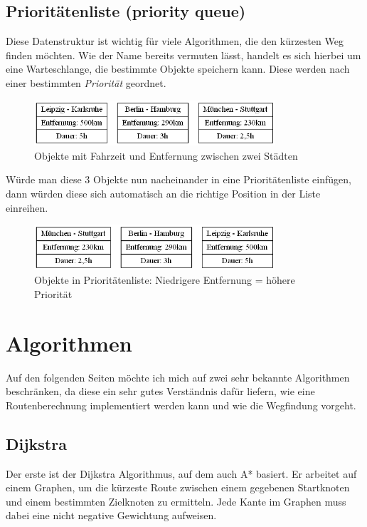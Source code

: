 \documentclass[11pt]{scrreprt}
\begin{document}
	\section{Prioritätenliste (priority queue)}
	Diese Datenstruktur ist wichtig für viele Algorithmen, die den kürzesten Weg finden möchten.
	Wie der Name bereits vermuten lässt, handelt es sich hierbei um eine Warteschlange, die bestimmte Objekte speichern kann.
	Diese werden nach einer bestimmten \textit{Priorität} geordnet.

	\begin{figure}[ht]
		\centering
		\includegraphics[width=0.8\textwidth]{Graphs/pq_objects}
		\caption{Objekte mit Fahrzeit und Entfernung zwischen zwei Städten}
	\end{figure}
	
	Würde man diese 3 Objekte nun nacheinander in eine Prioritätenliste einfügen, dann würden diese sich automatisch an die richtige Position in der Liste einreihen.
	
	\begin{figure}[ht]
		\centering
		\includegraphics[width=0.8\textwidth]{Graphs/pq_sorted_distance}
		\caption{Objekte in Prioritätenliste: Niedrigere Entfernung = höhere Priorität}
	\end{figure}

\chapter{Algorithmen}
Auf den folgenden Seiten möchte ich mich auf zwei sehr bekannte Algorithmen beschränken, da diese ein sehr gutes Verständnis dafür liefern, wie eine Routenberechnung implementiert werden kann und wie die Wegfindung vorgeht.

	\section{Dijkstra}
	Der erste ist der Dijkstra Algorithmus, auf dem auch A* basiert.
	Er arbeitet auf einem Graphen, um die kürzeste Route zwischen einem gegebenen Startknoten und einem bestimmten Zielknoten zu ermitteln. Jede Kante im Graphen muss dabei eine nicht negative Gewichtung aufweisen.
	
\end{document}
